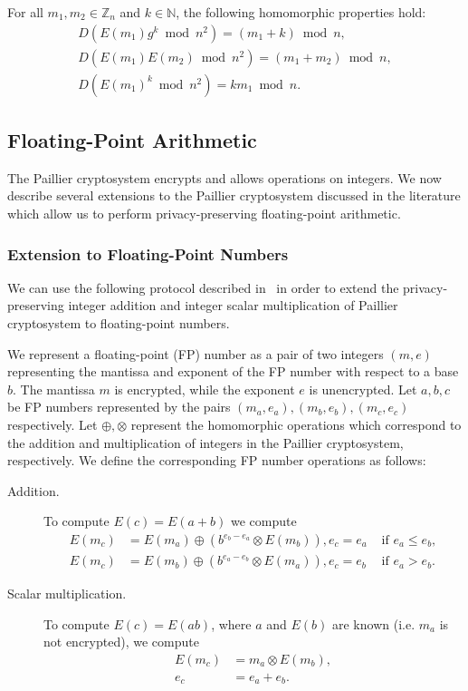 For all $m_1,m_2 \in \mathbb{Z}_n$ and $k\in \mathbb{N}$, the following homomorphic properties hold:
\begin{align*}
	D(E(m_1)g^k\bmod n^2)=(m_1+k)\bmod n,\\
	D(E(m_1)E(m_2)\bmod n^2)=(m_1+m_2)\bmod n,\\
	D(E(m_1)^k\bmod n^2)= km_1\bmod n.
\end{align*}

\subsection{Floating-Point Arithmetic}
\label{sec:fp_operations}
The Paillier cryptosystem encrypts and allows operations on integers. We now describe several extensions to the Paillier cryptosystem discussed in the literature which allow us to perform privacy-preserving floating-point arithmetic.

\subsubsection{Extension to Floating-Point Numbers}
\label{sec:fp_operations}
We can use the following protocol described in~\cite{ziad_cryptoimg:_2016} in order to extend the privacy-preserving integer addition and integer scalar multiplication of Paillier cryptosystem to floating-point numbers.

We represent a floating-point (FP) number as a pair of two integers $(m,e)$ representing the mantissa and exponent of the FP number with respect to a base $b$. The mantissa $m$ is encrypted, while the exponent $e$ is unencrypted.
Let $a,b,c$ be FP numbers represented by the pairs $(m_a,e_a),(m_b,e_b),(m_c,e_c)$ respectively. Let $\oplus,\otimes$ represent the homomorphic operations which correspond to the addition and multiplication of integers in the Paillier cryptosystem, respectively. We define the corresponding FP number operations as follows:
\begin{description}
  \item[Addition.]
    To compute $E(c)=E(a+b)$ we compute
    \begin{align*}
      E(m_c) &= E(m_a) \oplus (b^{e_b-e_a} \otimes E(m_b)), e_c = e_a & \text{ if } e_a \leq e_b, \\
      E(m_c) &= E(m_b) \oplus (b^{e_a-e_b} \otimes E(m_a)), e_c = e_b & \text{ if } e_a > e_b.
    \end{align*}
  \item[Scalar multiplication.]
    To compute $E(c) = E(ab)$, where $a$ and $E(b)$ are known (i.e. $m_a$ is not encrypted), we compute
    \begin{align*}
      E(m_c) &= m_a \otimes E(m_b),\\
      e_c &= e_a + e_b.
    \end{align*}
\end{description}
